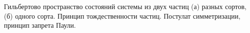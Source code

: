 \documentclass[__main__.tex]{subfiles}
\begin{document}
Гильбертово пространство состояний системы из двух частиц (а) разных сортов, (б) одного сорта. Принцип тождественности частиц. Постулат симметризации, принцип запрета Паули.\\ 

\end{document}
